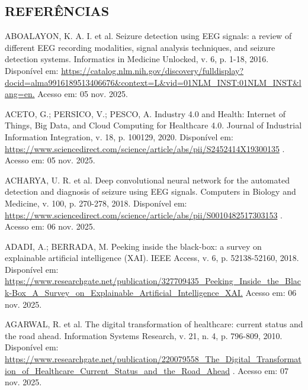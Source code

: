 \postextual\begin{SingleSpace}\chapter*{REFERÊNCIAS}
{\raggedright\setlength{\parindent}{0pt} ABOALAYON, K. A. I. et al. Seizure detection using EEG signals: a review of different EEG recording modalities, signal analysis techniques, and seizure detection systems. Informatics in Medicine Unlocked, v. 6, p. 1-18, 2016. Disponível em: \url{https://catalog.nlm.nih.gov/discovery/fulldisplay?docid=alma9916189513406676&context=L&vid=01NLM_INST:01NLM_INST&lang=en.} Acesso em: 05 nov. 2025.\par}\smallskip

{\raggedright\setlength{\parindent}{0pt} ACETO, G.; PERSICO, V.; PESCO, A. Industry 4.0 and Health: Internet of Things, Big Data, and Cloud Computing for Healthcare 4.0. Journal of Industrial Information Integration, v. 18, p. 100129, 2020. Disponível em: \url{https://www.sciencedirect.com/science/article/abs/pii/S2452414X19300135} . Acesso em: 05 nov. 2025.\par}\smallskip

{\raggedright\setlength{\parindent}{0pt} ACHARYA, U. R. et al. Deep convolutional neural network for the automated detection and diagnosis of seizure using EEG signals. Computers in Biology and Medicine, v. 100, p. 270-278, 2018. Disponível em: \url{https://www.sciencedirect.com/science/article/abs/pii/S0010482517303153} . Acesso em: 06 nov. 2025.\par}\smallskip

{\raggedright\setlength{\parindent}{0pt} ADADI, A.; BERRADA, M. Peeking inside the black-box: a survey on explainable artificial intelligence (XAI). IEEE Access, v. 6, p. 52138-52160, 2018. Disponível em: \url{https://www.researchgate.net/publication/327709435_Peeking_Inside_the_Black-Box_A_Survey_on_Explainable_Artificial_Intelligence_XAI.} Acesso em: 06 nov. 2025.\par}\smallskip

{\raggedright\setlength{\parindent}{0pt} AGARWAL, R. et al. The digital transformation of healthcare: current status and the road ahead. Information Systems Research, v. 21, n. 4, p. 796-809, 2010. Disponível em: \url{https://www.researchgate.net/publication/220079558_The_Digital_Transformation_of_Healthcare_Current_Status_and_the_Road_Ahead} . Acesso em: 07 nov. 2025.\par}\smallskip


\end{SingleSpace}
